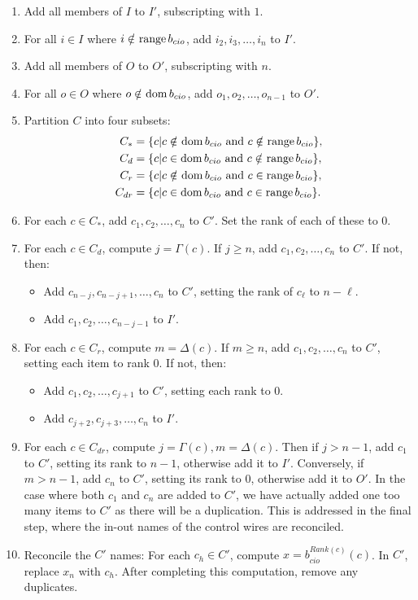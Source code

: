 \begin{enumerate}
  \item Add all members of $I$ to $I'$, subscripting with $1$.
  \item For all $i\in I$ where $i \in\hspace{-0.8em}/\hspace{0.2em} \operatorname*{range} b_{cio}$, add
    $i_2,i_3,\ldots,i_n$ to $I'$.
  \item Add all members of $O$ to $O'$, subscripting with $n$.
  \item For all $o\in O$ where $o \in\hspace{-0.8em}/\hspace{0.2em} \operatorname*{dom} b_{cio}$, add
    $o_1,o_2,\ldots,o_{n-1}$ to $O'$.
  \item Partition $C$ into four subsets:
  \begin{align*}
    C_*    &= \{c|c\nin \dom b_{cio}\text{ and }c\nin \rng b_{cio}\},\\
    C_d    &= \{c|c\in \dom b_{cio}\text{ and }c\nin \rng b_{cio}\},\\
    C_r    &= \{c|c\nin \dom b_{cio}\text{ and }c\in \rng b_{cio}\},\\
    C_{dr} &= \{c|c\in \dom b_{cio}\text{ and }c\in \rng b_{cio}\}.
  \end{align*}
  \item For each $c\in C_*$, add $c_1,c_2,\ldots,c_n$ to $C'$. Set the
    rank of each of these to $0$.
  \item For each $c\in C_d$, compute $j=\Gamma(c)$. If $j \ge n$, add
    $c_1,c_2,\ldots,c_n$ to $C'$. If not, then:
    \begin{itemize}
      \item Add $c_{n-j},c_{n-j+1},\ldots,c_n$ to $C'$, setting the
        rank of $c_\ell$ to $n-\ell$.
      \item Add $c_1,c_2,\ldots,c_{n-j-1}$ to $I'$.
    \end{itemize}
  \item For each $c\in C_r$, compute $m=\Delta(c)$. If $m \ge n$, add
    $c_1,c_2,\ldots,c_n$ to $C'$, setting each item to rank $0$.
    If not, then:
    \begin{itemize}
      \item Add $c_1,c_2,\ldots,c_{j+1}$ to $C'$, setting each rank to $0$.
      \item Add $c_{j+2},c_{j+3},\ldots,c_{n}$ to $I'$.
    \end{itemize}
  \item For each $c\in C_{dr}$, compute $j=\Gamma(c), m=\Delta(c)$. Then
    if $j>n-1$, add $c_1$ to $C'$, setting its rank to $n-1$, otherwise
    add it to $I'$. Conversely, if $m>n-1$, add $c_n$ to $C'$, setting its
    rank to $0$, otherwise add it to $O'$. In the case
    where both $c_1$ and $c_n$ are added to $C'$, we have actually added
    one too many items to $C'$ as there will be a duplication. This is
    addressed in the final step, where the in-out names of the control
    wires are reconciled.
  \item Reconcile the $C'$ names: For each $c_h\in C'$, compute
    $x=b_{cio}^{Rank(c)}(c)$. In $C'$, replace $x_n$ with $c_h$. After
    completing this computation, remove any duplicates.
\end{enumerate}

